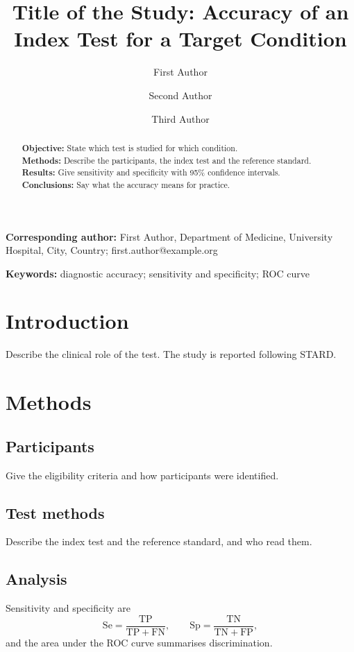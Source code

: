 \documentclass[11pt,a4paper]{article}
\title{Title of the Study: Accuracy of an Index Test for a Target Condition}
\author[1]{First Author}
\author[1,2]{Second Author}
\author[2]{Third Author}
\affil[1]{Department of Medicine, University Hospital, City, Country}
\affil[2]{School of Public Health, University, City, Country}
\date{}
\begin{document}
\maketitle

\noindent\textbf{Corresponding author:} First Author, Department of Medicine,
University Hospital, City, Country; first.author@example.org

\begin{abstract}
\noindent\textbf{Objective:} State which test is studied for which condition.\\
\textbf{Methods:} Describe the participants, the index test and the reference standard.\\
\textbf{Results:} Give sensitivity and specificity with 95\% confidence intervals.\\
\textbf{Conclusions:} Say what the accuracy means for practice.
\end{abstract}

\noindent\textbf{Keywords:} diagnostic accuracy; sensitivity and specificity; ROC curve

\section{Introduction}
Describe the clinical role of the test. The study is reported following STARD.\cite{bossuyt2015stard}

\section{Methods}
\subsection{Participants}
Give the eligibility criteria and how participants were identified.

\subsection{Test methods}
Describe the index test and the reference standard, and who read them.

\subsection{Analysis}
Sensitivity and specificity are
\begin{equation}
  \mathrm{Se} = \frac{\mathrm{TP}}{\mathrm{TP} + \mathrm{FN}}, \qquad
  \mathrm{Sp} = \frac{\mathrm{TN}}{\mathrm{TN} + \mathrm{FP}},
\end{equation}
and the area under the ROC curve summarises discrimination.\cite{hanley1982}
\end{document}
